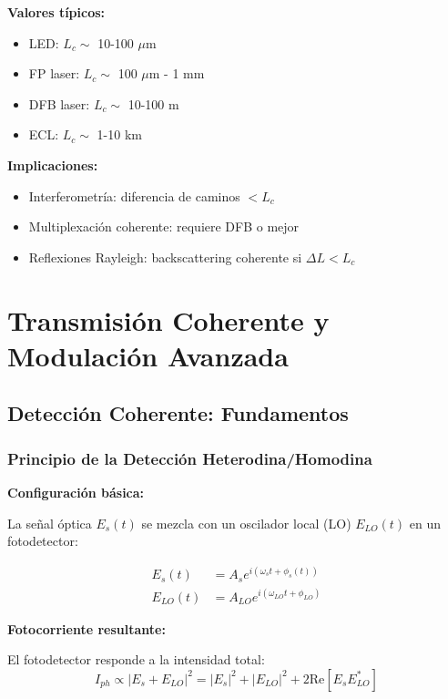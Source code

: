 \documentclass[11pt,a4paper]{article}
\begin{document}
\textbf{Valores típicos:}
\begin{itemize}
    \item LED: $L_c \sim$ 10-100 $\mu$m
    \item FP laser: $L_c \sim$ 100 $\mu$m - 1 mm
    \item DFB laser: $L_c \sim$ 10-100 m
    \item ECL: $L_c \sim$ 1-10 km
\end{itemize}

\textbf{Implicaciones:}
\begin{itemize}
    \item Interferometría: diferencia de caminos $< L_c$
    \item Multiplexación coherente: requiere DFB o mejor
    \item Reflexiones Rayleigh: backscattering coherente si $\Delta L < L_c$
\end{itemize}

\section{Transmisión Coherente y Modulación Avanzada}

\subsection{Detección Coherente: Fundamentos}

\subsubsection{Principio de la Detección Heterodina/Homodina}

\textbf{Configuración básica:}

La señal óptica $E_s(t)$ se mezcla con un oscilador local (LO) $E_{LO}(t)$ en un fotodetector:

\begin{align}
    E_s(t) &= A_s e^{i(\omega_s t + \phi_s(t))} \\
    E_{LO}(t) &= A_{LO} e^{i(\omega_{LO} t + \phi_{LO})}
\end{align}

\textbf{Fotocorriente resultante:}

El fotodetector responde a la intensidad total:
\begin{equation}
    I_{ph} \propto |E_s + E_{LO}|^2 = |E_s|^2 + |E_{LO}|^2 + 2\text{Re}[E_s E_{LO}^*]
\end{equation}
\end{document}
